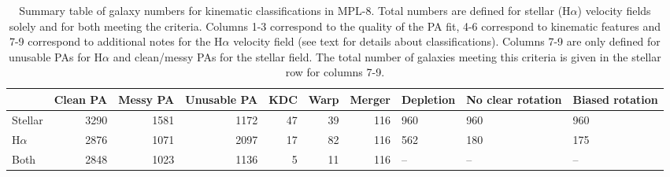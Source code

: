 \documentclass[fleqn,usenatbib]{mnras}
\begin{document}
\begin{table}
\begin{tabular}{lrrrrrrlll}
\hline
&  Clean PA &  Messy PA &  Unusable PA &  KDC &  Warp &  Merger & Depletion & No clear rotation & Biased rotation \\
\hline
Stellar &      3290 &      1581 &         1172 &   47 &    39 &     116 &       960 &               960 &             960 \\
H$\alpha$ &      2876 &      1071 &         2097 &   17 &    82 &     116 &       562 &               180 &             175 \\
Both &      2848 &      1023 &         1136 &    5 &    11 &     116 &        -- &                -- &              -- \\ 
\end{tabular}
\caption{Summary table of galaxy numbers for kinematic classifications in  MPL-8. Total numbers are defined for stellar (H$\alpha$) velocity fields solely and for both meeting the criteria. Columns 1-3 correspond to the quality of the PA fit, 4-6 correspond to kinematic features and 7-9 correspond to additional notes for the H$\alpha$ velocity field (see text for details about classifications). Columns 7-9 are only defined for unusable PAs for H$\alpha$ and clean/messy PAs for the stellar field. The total number of galaxies meeting this criteria is given in the stellar row for columns 7-9.}
\label{tab:kin_class}
\end{table}
\end{document}
